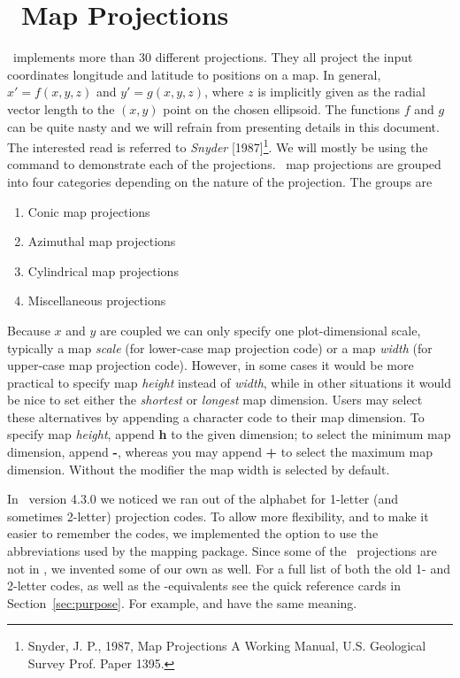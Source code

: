 %
%
\chapter{\gmt\ Map Projections}
\label{ch:6}

\GMT\ implements more than 30 different projections.  They all project the input coordinates
longitude and latitude to positions on a map.  In general, $x' = f(x,y,z)$ and $y' = g(x,y,z)$, where
$z$ is implicitly given as the radial vector length to the $(x,y)$ point on the chosen ellipsoid.  The functions $f$ and $g$ can be
quite nasty and we will refrain from presenting details in this document.  The interested read is referred to
\emph{Snyder} [1987]\footnote{Snyder, J. P., 1987, Map Projections \- A Working Manual, U.S. Geological Survey Prof. Paper 1395.}.
We will mostly be using the  command to demonstrate each of the projections.
\GMT\ map projections are grouped into four categories depending on the
nature of the projection.  The groups are

\begin{enumerate}
\item Conic map projections
\item Azimuthal map projections
\item Cylindrical map projections
\item Miscellaneous projections
\end{enumerate}

Because $x$ and $y$ are coupled we can only specify one plot-dimensional scale, typically
a map \emph{scale} (for lower-case map projection code) or a map \emph{width} (for upper-case
map projection code).  However, in some cases it would be more
practical to specify map \emph{height} instead of \emph{width}, while in other situations it would be nice
to set either the \emph{shortest} or \emph{longest} map dimension.  Users may select
these alternatives by appending a character code to their map dimension.  To specify map \emph{height},
append \textbf{h} to the given dimension; to select the minimum map dimension, append \textbf{-}, whereas you may
append \textbf{+} to select the maximum map dimension.  Without the modifier the map width is
selected by default.

In \GMT\ version 4.3.0 we noticed we ran out of the alphabet for 1-letter (and sometimes 2-letter) projection codes. To allow more flexibility, and to make it easier to remember the codes, we implemented the option to use the abbreviations used by the  mapping package. Since some of the \GMT\ projections are not in , we invented some of our own as well. For a full list of both the old 1- and 2-letter codes, as well as the -equivalents see the quick reference cards in Section~\ref{sec:purpose}. For example,  and  have the same meaning.

